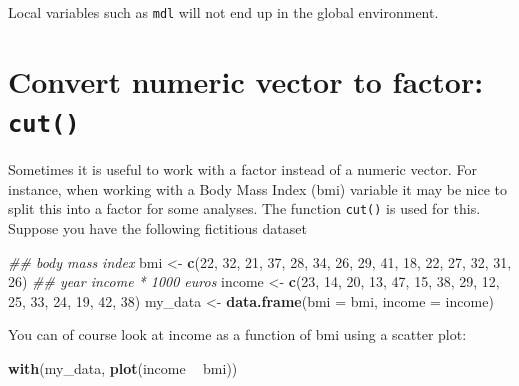 \documentclass[]{book}
\newenvironment{Shaded}{\begin{snugshade}}{\end{snugshade}}
\newcommand{\CommentTok}[1]{\textcolor[rgb]{0.56,0.35,0.01}{\textit{#1}}}
\newcommand{\DataTypeTok}[1]{\textcolor[rgb]{0.13,0.29,0.53}{#1}}
\newcommand{\DecValTok}[1]{\textcolor[rgb]{0.00,0.00,0.81}{#1}}
\newcommand{\KeywordTok}[1]{\textcolor[rgb]{0.13,0.29,0.53}{\textbf{#1}}}
\newcommand{\NormalTok}[1]{#1}
\newcommand{\OperatorTok}[1]{\textcolor[rgb]{0.81,0.36,0.00}{\textbf{#1}}}
\newcommand{\StringTok}[1]{\textcolor[rgb]{0.31,0.60,0.02}{#1}}
\begin{document}
Local variables such as \texttt{mdl} will not end up in the global environment.

\hypertarget{convert-numeric-vector-to-factor-cut}{%
\section{\texorpdfstring{Convert numeric vector to factor: \texttt{cut()}}{Convert numeric vector to factor: cut()}}\label{convert-numeric-vector-to-factor-cut}}

Sometimes it is useful to work with a factor instead of a numeric vector. For instance, when working with a Body Mass Index (bmi) variable it may be nice to split this into a factor for some analyses.
The function \texttt{cut()} is used for this.
Suppose you have the following fictitious dataset

\begin{Shaded}
\begin{Highlighting}[]
\CommentTok{## body mass index}
\NormalTok{bmi <-}\StringTok{ }\KeywordTok{c}\NormalTok{(}\DecValTok{22}\NormalTok{, }\DecValTok{32}\NormalTok{, }\DecValTok{21}\NormalTok{, }\DecValTok{37}\NormalTok{, }\DecValTok{28}\NormalTok{, }\DecValTok{34}\NormalTok{, }\DecValTok{26}\NormalTok{, }\DecValTok{29}\NormalTok{,}
         \DecValTok{41}\NormalTok{, }\DecValTok{18}\NormalTok{, }\DecValTok{22}\NormalTok{, }\DecValTok{27}\NormalTok{, }\DecValTok{32}\NormalTok{, }\DecValTok{31}\NormalTok{, }\DecValTok{26}\NormalTok{)}
\CommentTok{## year income * 1000 euros}
\NormalTok{income <-}\StringTok{ }\KeywordTok{c}\NormalTok{(}\DecValTok{23}\NormalTok{, }\DecValTok{14}\NormalTok{, }\DecValTok{20}\NormalTok{, }\DecValTok{13}\NormalTok{, }\DecValTok{47}\NormalTok{, }\DecValTok{15}\NormalTok{, }\DecValTok{38}\NormalTok{, }\DecValTok{29}\NormalTok{, }
            \DecValTok{12}\NormalTok{, }\DecValTok{25}\NormalTok{, }\DecValTok{33}\NormalTok{, }\DecValTok{24}\NormalTok{, }\DecValTok{19}\NormalTok{, }\DecValTok{42}\NormalTok{, }\DecValTok{38}\NormalTok{)}
\NormalTok{my_data <-}\StringTok{ }\KeywordTok{data.frame}\NormalTok{(}\DataTypeTok{bmi =}\NormalTok{ bmi, }\DataTypeTok{income =}\NormalTok{ income)}
\end{Highlighting}
\end{Shaded}

You can of course look at income as a function of bmi using a scatter plot:

\begin{Shaded}
\begin{Highlighting}[]
\KeywordTok{with}\NormalTok{(my_data, }\KeywordTok{plot}\NormalTok{(income }\OperatorTok{~}\StringTok{ }\NormalTok{bmi))}
\end{Highlighting}
\end{Shaded}
\end{document}
